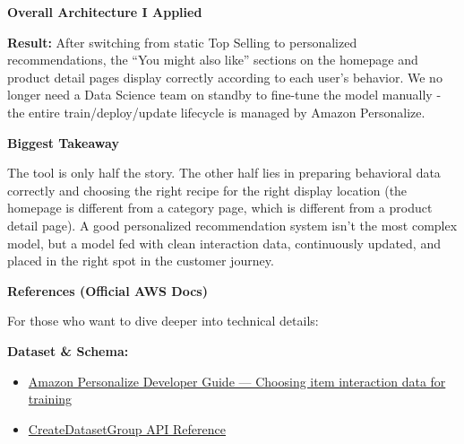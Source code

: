 \vspace{0.5em}\noindent\textbf{Overall Architecture I
Applied}\par

\begin{Shaded}
\begin{Highlighting}[]
\end{Highlighting}
\end{Shaded}

\textbf{Result:} After switching from static Top Selling to personalized
recommendations, the ``You might also like'' sections on the homepage
and product detail pages display correctly according to each user's
behavior. We no longer need a Data Science team on standby to fine-tune
the model manually - the entire train/deploy/update lifecycle is managed
by Amazon Personalize.

\vspace{0.5em}\noindent\textbf{Biggest Takeaway}\par

The tool is only half the story. The other half lies in preparing
behavioral data correctly and choosing the right recipe for the right
display location (the homepage is different from a category page, which
is different from a product detail page). A good personalized
recommendation system isn't the most complex model, but a model fed with
clean interaction data, continuously updated, and placed in the right
spot in the customer journey.

\vspace{0.5em}\noindent\textbf{References (Official AWS
Docs)}\par

For those who want to dive deeper into technical details:

\vspace{0.5em}\noindent\textbf{Dataset \& Schema:}\par

\begin{itemize}
\tightlist
\item
  \href{https://docs.aws.amazon.com/personalize/latest/dg/event-values-types.html}{Amazon
  Personalize Developer Guide --- Choosing item interaction data for
  training}
\item
  \href{https://docs.aws.amazon.com/personalize/latest/dg/API_CreateDatasetGroup.html}{CreateDatasetGroup
  API Reference}
\end{itemize}

